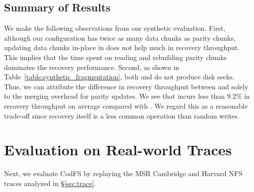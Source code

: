 \subsection{Summary of Results}

We make the following observations from our synthetic evaluation.
First, although our configuration has twice as many data chunks as
parity chunks, updating data chunks in-place in \PL does not help much in
recovery throughput.  This implies that the time spent on reading and
rebuilding parity chunks dominates the recovery performance.  Second, as shown
in Table~\ref{table:synthetic_fragmentation}, both \FO and \PLR do not
produce disk seeks. Thus, we can attribute the difference in recovery
throughput between \FO and \PLR solely to the merging overhead for parity
updates. We see that \PLR incurs less than ${9.2\%}$ in recovery
throughput on average compared with \FO. We regard this as a reasonable
trade-off since recovery itself is a less common operation than random writes.

\section{Evaluation on Real-world Traces}
\label{eval:trace}

Next, we evaluate CodFS by replaying the MSR Cambridge and Harvard NFS traces
analyzed in \S\ref{sec:trace}.

